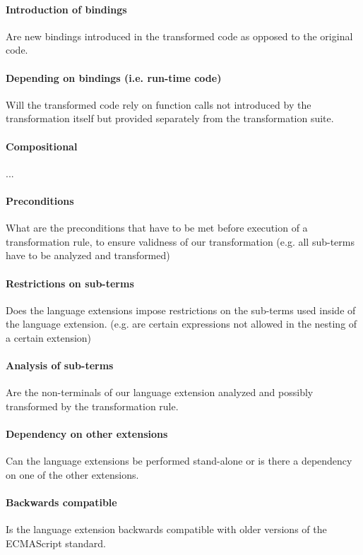 \documentclass[10pt,a4paper,draft]{article}
\begin{document}
\paragraph{Introduction of bindings}
Are new bindings introduced in the transformed code as opposed to the original code.

\paragraph{Depending on bindings (i.e. run-time code)}
Will the transformed code rely on function calls not introduced by the transformation itself but provided separately from the transformation suite.

\paragraph{Compositional}
...

\paragraph{Preconditions}
What are the preconditions that have to be met before execution of a transformation rule, to ensure validness of our transformation (e.g. all sub-terms have to be analyzed and transformed)

\paragraph{Restrictions on sub-terms}
Does the language extensions impose restrictions on the sub-terms used inside of the language extension. (e.g. are certain expressions not allowed in the nesting of a certain extension)

\paragraph{Analysis of sub-terms}
Are the non-terminals of our language extension analyzed and possibly transformed by the transformation rule.

\paragraph{Dependency on other extensions}
Can the language extensions be performed stand-alone or is there a dependency on one of the other extensions.

\paragraph{Backwards compatible}
Is the language extension backwards compatible with older versions of the ECMAScript standard.
\end{document}
